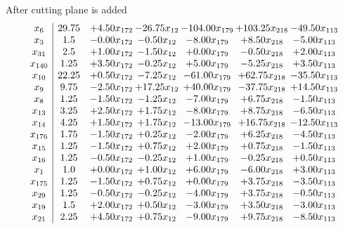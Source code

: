 \documentclass[8pt]{article}
\begin{document}
 After cutting plane is added 
\[\begin{array}{c| c c@{\hskip 2pt} c@{\hskip 2pt} c@{\hskip 2pt} c@{\hskip 2pt} c@{\hskip 2pt} }
 x_{6}   &  29.75 & +  4.50 x_{172} & -26.75 x_{12} & -104.00 x_{179} & + 103.25 x_{218} & -49.50 x_{113}\\
 x_{3}   &  1.5 & -0.00 x_{172} & -0.50 x_{12} & -8.00 x_{179} & +  8.50 x_{218} & -5.00 x_{113}\\
 x_{31}   &  2.5 & +  1.00 x_{172} & -1.50 x_{12} & +  0.00 x_{179} & -0.50 x_{218} & +  2.00 x_{113}\\
 x_{140}   &  1.25 & +  3.50 x_{172} & -0.25 x_{12} & +  5.00 x_{179} & -5.25 x_{218} & +  3.50 x_{113}\\
 x_{10}   &  22.25 & +  0.50 x_{172} & -7.25 x_{12} & -61.00 x_{179} & + 62.75 x_{218} & -35.50 x_{113}\\
 x_{9}   &  9.75 & -2.50 x_{172} & + 17.25 x_{12} & + 40.00 x_{179} & -37.75 x_{218} & + 14.50 x_{113}\\
 x_{8}   &  1.25 & -1.50 x_{172} & -1.25 x_{12} & -7.00 x_{179} & +  6.75 x_{218} & -1.50 x_{113}\\
 x_{13}   &  3.25 & +  2.50 x_{172} & +  1.75 x_{12} & -8.00 x_{179} & +  8.75 x_{218} & -6.50 x_{113}\\
 x_{14}   &  4.25 & +  1.50 x_{172} & +  1.75 x_{12} & -13.00 x_{179} & + 16.75 x_{218} & -12.50 x_{113}\\
 x_{176}   &  1.75 & -1.50 x_{172} & +  0.25 x_{12} & -2.00 x_{179} & +  6.25 x_{218} & -4.50 x_{113}\\
 x_{15}   &  1.25 & -1.50 x_{172} & +  0.75 x_{12} & +  2.00 x_{179} & +  0.75 x_{218} & -1.50 x_{113}\\
 x_{16}   &  1.25 & -0.50 x_{172} & -0.25 x_{12} & +  1.00 x_{179} & -0.25 x_{218} & +  0.50 x_{113}\\
 x_{1}   &  1.0 & +  0.00 x_{172} & +  1.00 x_{12} & +  6.00 x_{179} & -6.00 x_{218} & +  3.00 x_{113}\\
 x_{175}   &  1.25 & -1.50 x_{172} & +  0.75 x_{12} & +  0.00 x_{179} & +  3.75 x_{218} & -3.50 x_{113}\\
 x_{29}   &  1.25 & -0.50 x_{172} & -0.25 x_{12} & -4.00 x_{179} & +  3.75 x_{218} & -0.50 x_{113}\\
 x_{19}   &  1.5 & +  2.00 x_{172} & +  0.50 x_{12} & -3.00 x_{179} & +  3.50 x_{218} & -3.00 x_{113}\\
 x_{21}   &  2.25 & +  4.50 x_{172} & +  0.75 x_{12} & -9.00 x_{179} & +  9.75 x_{218} & -8.50 x_{113}\\

\end{array}\]
\end{document}
